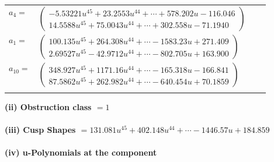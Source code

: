 \documentclass[1p]{elsarticle_modified}
\theoremstyle{definition}
\begin{document}
\begin{tabular}{m{7pt} m{180pt} m{7pt} m{180pt} }
\flushright $a_{4}=$&$\begin{pmatrix}-5.53221 u^{45}+23.2553 u^{44}+\cdots+578.202 u-116.046\\14.5588 u^{45}+75.0043 u^{44}+\cdots+302.558 u-71.1940\end{pmatrix}$ \\
\flushright $a_{1}=$&$\begin{pmatrix}100.135 u^{45}+264.308 u^{44}+\cdots-1583.23 u+271.409\\2.69527 u^{45}-42.9712 u^{44}+\cdots-802.705 u+163.900\end{pmatrix}$ \\
\flushright $a_{10}=$&$\begin{pmatrix}348.927 u^{45}+1171.16 u^{44}+\cdots-165.318 u-166.841\\87.5862 u^{45}+262.982 u^{44}+\cdots-640.454 u+70.1859\end{pmatrix}$\\&\end{tabular}
\flushleft \textbf{(ii) Obstruction class $= 1$}\\~\\
\flushleft \textbf{(iii) Cusp Shapes $= 131.081 u^{45}+402.148 u^{44}+\cdots-1446.57 u+184.859$}\\~\\
\newpage\renewcommand{\arraystretch}{1}
\flushleft \textbf{(iv) u-Polynomials at the component}\newline \\
\end{document}
